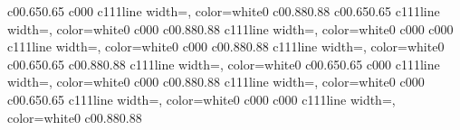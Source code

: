 \documentclass{standalone}
\begin{document}
\begin{knitdiagram}
{c}{0}{0.65}{0.65}
{c}{0}{0}{0}
{c}{1}{1}{1}{line width=\outlineThickness*\dx, color=white}{0}
{c}{0}{0.88}{0.88}
{c}{0}{0.65}{0.65}
{c}{1}{1}{1}{line width=\outlineThickness*\dx, color=white}{0}
{c}{0}{0}{0}
{c}{0}{0.88}{0.88}
{c}{1}{1}{1}{line width=\outlineThickness*\dx, color=white}{0}
{c}{0}{0}{0}
{c}{0}{0}{0}
{c}{1}{1}{1}{line width=\outlineThickness*\dx, color=white}{0}
{c}{0}{0}{0}
{c}{0}{0.88}{0.88}
{c}{1}{1}{1}{line width=\outlineThickness*\dx, color=white}{0}
{c}{0}{0.65}{0.65}
{c}{0}{0.88}{0.88}
{c}{1}{1}{1}{line width=\outlineThickness*\dx, color=white}{0}
{c}{0}{0.65}{0.65}
{c}{0}{0}{0}
{c}{1}{1}{1}{line width=\outlineThickness*\dx, color=white}{0}
{c}{0}{0}{0}
{c}{0}{0.88}{0.88}
{c}{1}{1}{1}{line width=\outlineThickness*\dx, color=white}{0}
{c}{0}{0}{0}
{c}{0}{0.65}{0.65}
{c}{1}{1}{1}{line width=\outlineThickness*\dx, color=white}{0}
{c}{0}{0}{0}
{c}{0}{0}{0}
{c}{1}{1}{1}{line width=\outlineThickness*\dx, color=white}{0}
{c}{0}{0.88}{0.88}
\end{knitdiagram}
\end{document}
